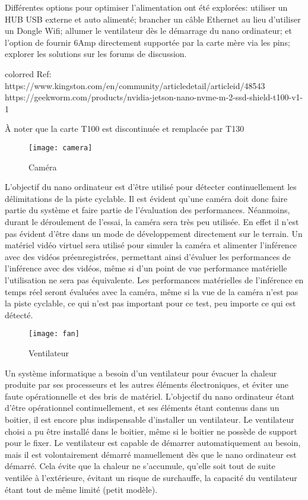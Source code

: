 \par Différentes options pour optimiser l'alimentation ont été explorées: utiliser un HUB USB externe et auto alimenté; brancher un câble Ethernet au lieu d'utiliser un Dongle Wifi; allumer le ventilateur dès le démarrage du nano ordinateur; et l'option de fournir 6Amp directement supportée par la carte mère via les pins; explorer les solutions sur les forums de discussion. 
{color{red}
Ref: https://www.kingston.com/en/community/articledetail/articleid/48543
https://geekworm.com/products/nvidia-jetson-nano-nvme-m-2-ssd-shield-t100-v1-1
\par À noter que la carte T100 est discontinuée et remplacée par T130
}
\begin{figure}[H]
    \centering
    \texttt{[image: camera]}
    \caption{Caméra}
    \label{fig:camera}
\end{figure}
\par L'objectif du nano ordinateur est d'être utilisé pour détecter continuellement les délimitations de la piste cyclable. Il est évident qu'une caméra doit donc faire partie du système et faire partie de l'évaluation des performances. Néanmoins, durant le déroulement de l'essai, la caméra sera très peu utilisée. En effet il n'est pas évident d'être dans un mode de développement directement sur le terrain. Un matériel vidéo virtuel sera utilisé pour simuler la caméra et alimenter l'inférence avec des vidéos préenregistrées, permettant ainsi d'évaluer les performances de l'inférence avec des vidéos, même si d'un point de vue performance matérielle l'utilisation ne sera pas équivalente. Les performances matérielles de l'inférence en temps réel seront évaluées avec la caméra, même si la vue de la caméra n'est pas la piste cyclable, ce qui n'est pas important pour ce test, peu importe ce qui est détecté.
\begin{figure}[H]
    \centering
    \texttt{[image: fan]}
    \caption{Ventilateur}
    \label{fig:fan}
\end{figure}
\par Un système informatique a besoin d'un ventilateur pour évacuer la chaleur produite par ses processeurs et les autres éléments électroniques, et éviter une faute opérationnelle et des bris de matériel. L'objectif du nano ordinateur étant d'être opérationnel continuellement, et ses éléments étant contenus dans un boitier, il est encore plus indispensable d'installer un ventilateur. Le ventilateur choisi a pu être installé dans le boitier, même si le boitier ne possède de support pour le fixer. Le ventilateur est capable de démarrer automatiquement au besoin, mais il est volontairement démarré manuellement dès que le nano ordinateur est démarré. Cela évite que la chaleur ne s'accumule, qu'elle soit tout de suite ventilée à l'extérieure, évitant un risque de surchauffe, la capacité du ventilateur étant tout de même limité (petit modèle).
